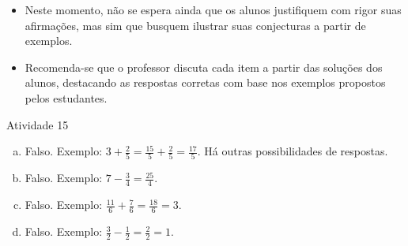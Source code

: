    \vspace{.15cm}

  \begin{itemize} %
    \item       Neste momento, não se espera ainda que os alunos justifiquem com rigor suas afirmações, mas sim que busquem ilustrar suas conjecturas a partir de exemplos.
    \item       Recomenda-se que o professor discuta cada item a partir das soluções dos alunos, destacando as respostas corretas com base nos exemplos propostos pelos estudantes.
\end{itemize} %


\begin{resposta*}{Atividade 15}

\begin{enumerate} [a)] %
    \item       Falso. Exemplo: $3 + \frac{2}{5} = \frac{15}{5}+\frac{2}{5} = \frac{17}{5}$.  Há outras possibilidades de respostas.
    \item       Falso. Exemplo:       $7 - \frac{3}{4} = \frac{25}{4}$.
    \item       Falso. Exemplo:       $\frac{11}{6} + \frac{7}{6} = \frac{18}{6} = 3$.
    \item       Falso. Exemplo:       $\frac{3}{2} - \frac{1}{2} = \frac{2}{2} = 1$.
\end{enumerate} %


\end{resposta*}
